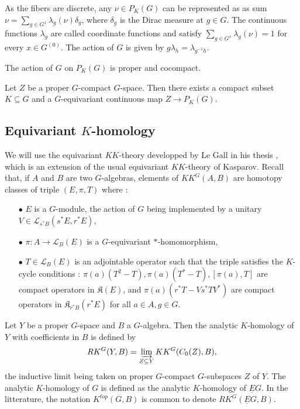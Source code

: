 As the fibers are discrete, any $\nu\in P_K(G)$ can be represented as as sum $\nu = \sum_{g\in G^x} \lambda_g(\nu)\delta_g$, where $\delta_g$ is the Dirac measure at $g\in G $. The continuous functions $\lambda_g$ are called coordinate functions and satisfy $\sum_{g\in G^x} \lambda_g(\nu) =1$ for every $x\in G^{(0)}$. The action of $G$ is given by $g\lambda_h = \lambda_{g^{-1}h}$.

\begin{lem}
The action of $G$ on $P_K(G)$ is proper and cocompact.
\end{lem}  

\begin{lem}\label{Gspace}
Let $Z$ be a proper $G$-compact $G$-space. Then there exists a compact subset $K\subseteq G$ and a $G$-equivariant continuous map $Z\rightarrow P_K(G)$.
\end{lem}  

\subsection{Equivariant $K$-homology}

We will use the equivariant $KK$-theory developped by Le Gall in his thesis \cite{LeGall}, which is an extension of the usual equivariant $KK$-theory of Kasparov. Recall that, if $A$ and $B$ are two $G$-algebras, elements of $KK^G(A,B)$ are homotopy classes of triple $(E,\pi,T)$ where :\\

\begin{itemize}
\item[$\bullet$] $E$ is a $G$-module, the action of $G$ being implemented by a unitary $V\in\mathcal L_{s^* B}(s^* E, r^* E)$,
\item[$\bullet$] $\pi : A\rightarrow \mathcal L_B(E)$ is a $G$-equivariant $*$-homomorphism,
\item[$\bullet$] $T\in \mathcal L_B(E)$ is an adjointable operator such that the triple satisfies the $K$-cycle conditions : $\pi(a)(T^2-T),\pi(a)(T^*-T),[\pi(a),T]$ are compact operators in $\mathfrak K(E)$, and $\pi(a)(r^*T-V s^*T V^*)$ are compact operators in $\mathfrak K_{r^* B}(r^* E)$ for all $a\in A, g\in G$.\\
\end{itemize}

\begin{definition}
Let $Y$ be a proper $G$-space and $B$ a $G$-algebra. Then the analytic $K$-homology of $Y$ with coefficients in $B$ is defined by 
\[RK^G(Y,B) = \varinjlim_{Z\subseteq Y} KK^G(C_0(Z),B), \]
the inductive limit being taken on proper $G$-compact $G$-subspaces $Z$ of $Y$. The analytic $K$-homology of $G$ is defined as the analytic $K$-homology of $\underline E G$. In the litterature, the notation $K^{top}(G,B)$ is common to denote $RK^G(\underline E G,B)$.
\end{definition}

